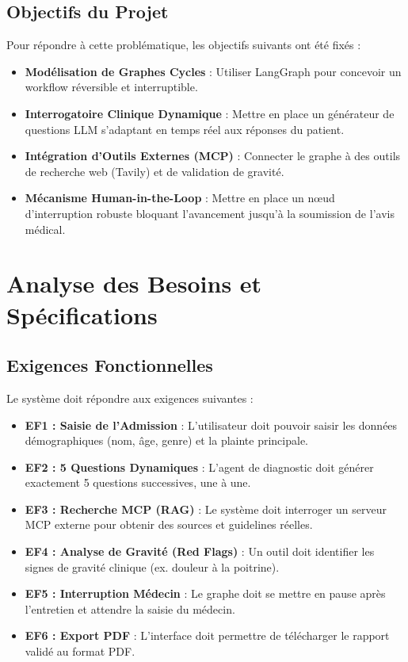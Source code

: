 \documentclass[11pt,a4paper]{report}
\begin{document}
\section{Objectifs du Projet}
Pour répondre à cette problématique, les objectifs suivants ont été fixés :
\begin{itemize}
    \item \textbf{Modélisation de Graphes Cycles} : Utiliser LangGraph pour concevoir un workflow réversible et interruptible.
    \item \textbf{Interrogatoire Clinique Dynamique} : Mettre en place un générateur de questions LLM s'adaptant en temps réel aux réponses du patient.
    \item \textbf{Intégration d'Outils Externes (MCP)} : Connecter le graphe à des outils de recherche web (Tavily) et de validation de gravité.
    \item \textbf{Mécanisme Human-in-the-Loop} : Mettre en place un nœud d'interruption robuste bloquant l'avancement jusqu'à la soumission de l'avis médical.
\end{itemize}

\chapter{Analyse des Besoins et Spécifications}
\section{Exigences Fonctionnelles}
Le système doit répondre aux exigences suivantes :
\begin{itemize}
    \item \textbf{EF1 : Saisie de l'Admission} : L'utilisateur doit pouvoir saisir les données démographiques (nom, âge, genre) et la plainte principale.
    \item \textbf{EF2 : 5 Questions Dynamiques} : L'agent de diagnostic doit générer exactement 5 questions successives, une à une.
    \item \textbf{EF3 : Recherche MCP (RAG)} : Le système doit interroger un serveur MCP externe pour obtenir des sources et guidelines réelles.
    \item \textbf{EF4 : Analyse de Gravité (Red Flags)} : Un outil doit identifier les signes de gravité clinique (ex. douleur à la poitrine).
    \item \textbf{EF5 : Interruption Médecin} : Le graphe doit se mettre en pause après l'entretien et attendre la saisie du médecin.
    \item \textbf{EF6 : Export PDF} : L'interface doit permettre de télécharger le rapport validé au format PDF.
\end{itemize}
\end{document}
